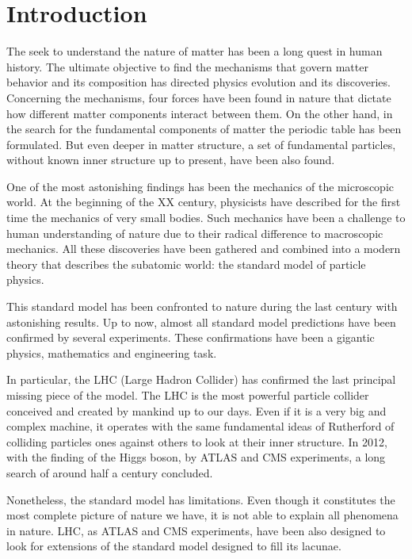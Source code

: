 \chapter*{Introduction}

The seek to understand the nature of matter has been a long quest in human history. The ultimate objective to find the mechanisms that govern matter behavior and its composition has directed physics evolution and its discoveries. Concerning the mechanisms, four forces have been found in nature that dictate how different matter components interact between them. On the other hand, in the search for the fundamental components of matter the periodic table has been formulated. But even deeper in matter structure, a set of fundamental particles, without known inner structure up to present, have been also found. 

One of the most astonishing findings has been the mechanics of the microscopic world. At the beginning of the XX century, physicists have described for the first time the mechanics of very small bodies. Such mechanics have been a challenge to human understanding of nature due to their radical difference to macroscopic mechanics. All these discoveries have been gathered and combined into a modern theory that describes the subatomic world: the standard model of particle physics. 

This standard model has been confronted to nature during the last century with astonishing results. Up to now, almost all standard model predictions have been confirmed by several experiments. These confirmations have been a gigantic physics, mathematics and engineering task.

In particular, the LHC (Large Hadron Collider) has confirmed the last principal missing piece of the model. The LHC is the most powerful particle collider conceived and created by mankind up to our days. Even if it is a very big and complex machine, it operates with the same fundamental ideas of Rutherford of colliding particles ones against others to look at their inner structure. In 2012, with the finding of the Higgs boson, by ATLAS and CMS experiments, a long search of around half a century concluded.

Nonetheless, the standard model has limitations. Even though it constitutes the most complete picture of nature we have, it is not able to explain all phenomena in nature. LHC, as ATLAS and CMS experiments, have been also designed to look for extensions of the standard model designed to fill its lacunae. 

